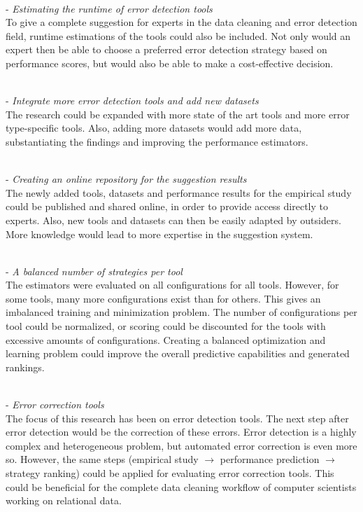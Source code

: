 ~\\- \textit{Estimating the runtime of error detection tools}
~\\ To give a complete suggestion for experts in the data cleaning and error detection field, runtime estimations of the tools could also be included. Not only would an expert then be able to choose a preferred error detection strategy based on performance scores, but would also be able to make a cost-effective decision.

~\\- \textit{Integrate more error detection tools and add new datasets}
~\\ The research could be expanded with more state of the art tools and more error type-specific tools. Also, adding more datasets would add more data, substantiating the findings and improving the performance estimators.

~\\- \textit{Creating an online repository for the suggestion results}
~\\ The newly added tools, datasets and performance results for the empirical study could be published and shared online, in order to provide access directly to experts. Also, new tools and datasets can then be easily adapted by outsiders. More knowledge would lead to more expertise in the suggestion system.

~\\- \textit{A balanced number of strategies per tool}
~\\ The estimators were evaluated on all configurations for all tools. However, for some tools, many more configurations exist than for others. This gives an imbalanced training and minimization problem. The number of configurations per tool could be normalized, or scoring could be discounted for the tools with excessive amounts of configurations. Creating a balanced optimization and learning problem could improve the overall predictive capabilities and generated rankings. 

~\\- \textit{Error correction tools}
~\\ The focus of this research has been on error detection tools. The next step after error detection would be the correction of these errors. Error detection is a highly complex and heterogeneous problem, but automated error correction is even more so. However, the same steps (empirical study $\rightarrow$ performance prediction $\rightarrow$ strategy ranking) could be applied for evaluating error correction tools. This could be beneficial for the complete data cleaning workflow of computer scientists working on relational data.